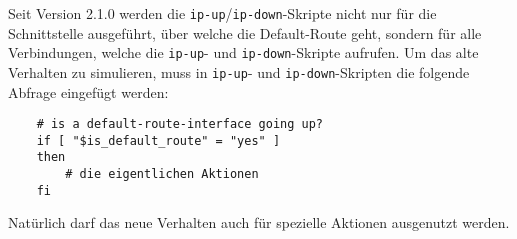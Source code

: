 Seit Version 2.1.0 werden die \texttt{ip-up}/\texttt{ip-down}-Skripte nicht nur
für die Schnittstelle ausgeführt, über welche die Default-Route geht, sondern
für alle Verbindungen, welche die \texttt{ip-up}- und \texttt{ip-down}-Skripte
aufrufen. Um das alte Verhalten zu simulieren, muss in \texttt{ip-up}- und
\texttt{ip-down}-Skripten die folgende Abfrage eingefügt werden:

\begin{example}
\begin{verbatim}
    # is a default-route-interface going up?
    if [ "$is_default_route" = "yes" ]
    then
        # die eigentlichen Aktionen
    fi
\end{verbatim}
\end{example}

Natürlich darf das neue Verhalten auch für spezielle Aktionen
ausgenutzt werden.
